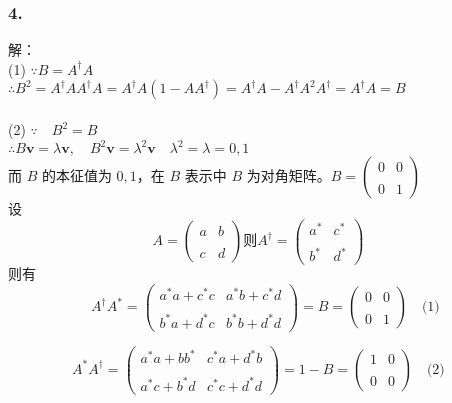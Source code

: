 \subsubsection{4.}
解：\\
(1) $\because B = A^\dagger A$\\
$\therefore B^2 = A^\dagger A A^\dagger A = A^\dagger A \left(1 - AA^\dagger \right) = A^\dagger A - A^\dagger A^2 A^\dagger=A^\dagger A=B$\\\\
(2) 
$\because \quad B^2 = B$\\
$\therefore B \mathbf{v} = \lambda \mathbf{v}, \quad B^2 \mathbf{v} = \lambda^2 \mathbf{v} \quad \lambda^2 = \lambda = 0, 1$\\
$\text{而 } B \text{ 的本征值为 } 0, 1 \text{，在 } B \text{ 表示中 } B \text{ 为对角矩阵。}
B = \begin{pmatrix} 0 & 0 \\\\ 0 & 1 \end{pmatrix}$\\
设
$$A = \begin{pmatrix} a & b \\\\ c & d \end{pmatrix} \text{则}A^\dagger = \begin{pmatrix} a^* & c^* \\\\ b^* & d^* \end{pmatrix}~$$
则有  $$\quad  A^ \dagger A^* =  \begin{pmatrix} a^*a + c^*c & a^*b + c^*d \\\\ b^*a + d^*c & b^*b + d^*d  \end{pmatrix} = B =  \begin{pmatrix} 0 & 0 \\\\ 0 & 1  \end{pmatrix}  \quad  \text{(1)}~$$

$$ A^* A^ \dagger = \begin{pmatrix} a^* a + b b^* & c^* a + d^* b \\\\ a^* c + b^*d & c^* c + d^* d  \end{pmatrix} = 1 - B =  \begin{pmatrix} 1 & 0 \\\\ 0 & 0  \end{pmatrix} \quad \text{(2)}~$$

